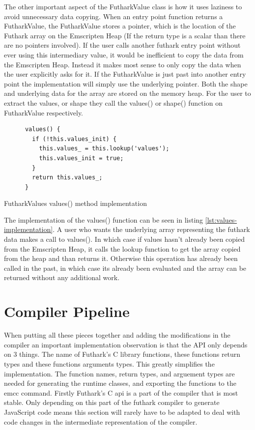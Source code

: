 \documentclass[11pt]{book}
\begin{document}
The other important aspect of the FutharkValue class is how it uses laziness to avoid unnecessary data copying. When an entry point function returns a FutharkValue, the FutharkValue stores a pointer, which is the location of the Futhark array on the Emscripten Heap (If the return type is a scalar than there are no pointers involved). If the user calls another futhark entry point without ever using this intermediary value, it would be inefficient to copy the data from the Emscripten Heap. Instead it makes most sense to only copy the data when the user explicitly asks for it. If the FutharkValue is just past into another entry point the implementation will simply use the underlying pointer. Both the shape and underlying data for the array are stored on the memory heap. For the user to extract the values, or shape they call the values() or shape() function on FutharkValue respectively.
\begin{listing}[H]
\begin{verbatim}
      values() {
        if (!this.values_init) {
          this.values_ = this.lookup('values');
          this.values_init = true;
        }
        return this.values_;
      }
\end{verbatim}
\caption{FutharkValues values() method implementation}
\label{lst:values-implementation}
\end{listing}

The implementation of the values() function can be seen in listing \ref{lst:values-implementation}. A user who wants the underlying array representing the futhark data makes a call to values(). In which case if values hasn't already been copied from the Emscripten Heap, it calls the lookup function to get the array copied from the heap and than returns it. Otherwise this operation has already been called in the past, in which case its already been evaluated and the array can be returned without any additional work. 

\section{Compiler Pipeline}

When putting all these pieces together and adding the modifications in the compiler an important implementation observation is that the API only depends on 3 things. The name of Futhark's C library functions, these functions return types and these functions arguments types. This greatly simplifies the implementation. The function names, return types, and arguement types are needed for generating the runtime classes, and exporting the functions to the emcc command. Firstly Futhark's C api is a part of the compiler that is most stable. Only depending on this part of the futhark compiler to generate JavaScript code means this section will rarely have to be adapted to deal with code changes in the intermediate representation of the compiler.
\end{document}
